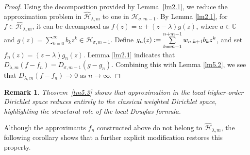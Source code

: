 \documentclass[12pt,reqno]{amsart}
\newtheorem{remark}{Remark}
\begin{document}
\begin{proof}
Using the decomposition provided by Lemma~\ref{lm2.1},
we reduce the approximation problem in $\widehat{\mathcal{H}}_{\lambda,m}$
to one in $\mathcal{H}_{\sigma,m-1}$. By Lemma \ref{lm2.1}, for \( f \in \widehat{\mathcal{H}}_{\lambda, m} \), it can be decomposed as \( f(z)= a + (z - \lambda) g(z)\), where $a\in\mathbb{C}$ and \( g(z) = \sum\limits_{k = 0}^\infty  {{b_k}{z^k}}  \in \mathcal{H}_{\sigma, m - 1} \). Define ${g_n}(z): = \sum\limits_{k = m - 1}^{n + m - 1} {{w_{n,k + 1}}} {b_k}{z^k}{\rm{ }}$, and set $ f_n(z) = (z - \lambda) g_n(z) $. Lemma \ref{lm2.1} indicates that ${D_{\lambda ,m}}(f - {f_n}) = {D_{\sigma ,m - 1}}(g - {g_n})$. Combining this with Lemma \ref{lm5.2}, we see that $D_{\lambda, m}(f - f_n) \to 0 \text{ as }  n \to \infty$.
\end{proof}

\begin{remark}
Theorem~\ref{tm5.3} shows that approximation in the local higher-order
Dirichlet space reduces entirely to the classical weighted Dirichlet space,
highlighting the structural role of the local Douglas formula.
\end{remark}

Although the approximants $f_n$ constructed above do not belong to
$\widehat{\mathcal{H}}_{\lambda,m}$, the following corollary shows that
a further explicit modification restores this property.
\end{document}

